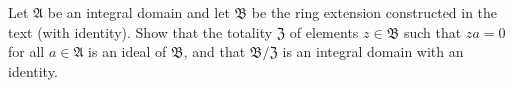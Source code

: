 Let $\mathfrak{A}$ be an integral domain and let $\mathfrak{B}$ be the ring extension constructed in the text (with identity). Show that the totality $\mathfrak{Z}$ of elements $z \in \mathfrak{B}$ such that $za = 0$ for all $a \in \mathfrak{A}$ is an ideal of $\mathfrak{B}$, and that $\mathfrak{B}/\mathfrak{Z}$ is an integral domain with an identity.
